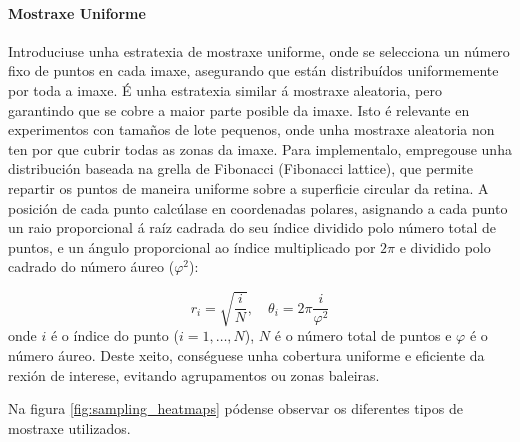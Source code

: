 \paragraph{Mostraxe Uniforme}
Introduciuse unha estratexia de mostraxe uniforme, onde se selecciona un número fixo de puntos en cada imaxe, asegurando que están distribuídos uniformemente por toda a imaxe. É unha estratexia similar á mostraxe aleatoria, pero garantindo que se cobre a maior parte posible da imaxe. Isto é relevante en experimentos con tamaños de lote pequenos, onde unha mostraxe aleatoria non ten por que cubrir todas as zonas da imaxe. Para implementalo, empregouse unha distribución baseada na grella de Fibonacci (Fibonacci lattice), que permite repartir os puntos de maneira uniforme sobre a superficie circular da retina. A posición de cada punto calcúlase en coordenadas polares, asignando a cada punto un raio proporcional á raíz cadrada do seu índice dividido polo número total de puntos, e un ángulo proporcional ao índice multiplicado por $2\pi$ e dividido polo cadrado do número áureo ($\varphi^2$):

\[
r_i = \sqrt{\frac{i}{N}}, \quad \theta_i = 2\pi \frac{i}{\varphi^2}
\]
onde $i$ é o índice do punto ($i = 1, \dots, N$), $N$ é o número total de puntos e $\varphi$ é o número áureo. Deste xeito, conséguese unha cobertura uniforme e eficiente da rexión de interese, evitando agrupamentos ou zonas baleiras.

Na figura \ref{fig:sampling_heatmaps} pódense observar os diferentes tipos de mostraxe utilizados.

